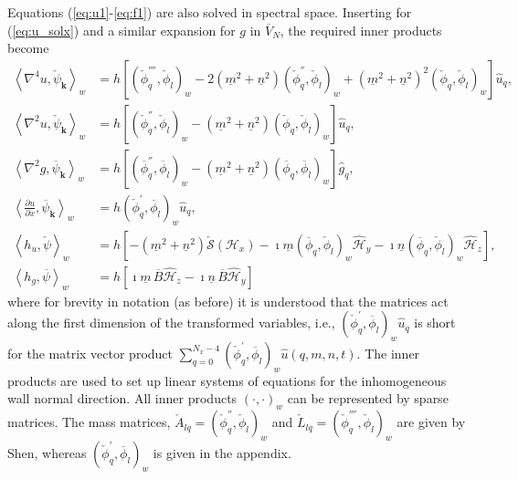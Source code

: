 \documentclass[11pt, oneside]{article}
\newcommand{\N}[1]{\check{#1}}
\newcommand{\D}[1]{\overline{#1}}
\begin{document}
Equations (\ref{eq:u1}-\ref{eq:f1}) are also solved in spectral space. 
Inserting for (\ref{eq:u_solx}) and a similar expansion for $g$ in $\D{V}_N$, 
the required inner products become
\begin{align}
\left<\nabla^4u, \N{\psi}_{\bm{k}}\right>_w &= h\left[ \left( 
\N{\phi}_q^{''''}, 
\N{\phi}_l\right)_w -2(\underline{m}^2+\underline{n}^2) \left( \N{\phi}_q^{''}, 
\N{\phi}_l\right)_w + (\underline{m}^2+\underline{n}^2)^2\left( \N{\phi}_q, 
\N{\phi}_l\right)_w  \right] \hat{u}_q, \\
\left< \nabla^2 u, \N{\psi}_{\bm{k}}\right>_w &= h\left[\left( \N{\phi}_q^{''}, 
\N{\phi}_l\right)_w - (\underline{m}^2+\underline{n}^2)\left( \N{\phi}_q, 
\N{\phi}_l \right)_w \right] \hat{u}_q, \\
\left< \nabla^2 g, \D{\psi}_{\bm{k}}\right>_w &= h\left[\left( \D{\phi}_q^{''}, 
\D{\phi}_l\right)_w - (\underline{m}^2+\underline{n}^2)\left( \D{\phi}_q, 
\D{\phi}_l \right)_w \right] \hat{g}_q, \\
\left<\frac{\partial u}{\partial x}, \D{\psi}_{\bm{k}}\right>_w &=
h\left(\N{\phi}_q^{'}, \D{\phi}_l\right)_w \hat{u}_q, \\
\left<h_u, \N{\psi} \right>_w &= h\left[-(\underline{m}^2+\underline{n}^2) 
\N{\mathcal{S}}(\mathcal{H}_x) - \imath \underline{m}\left(\D{\phi}_q, 
\N{\phi}_l \right)_w \hat{\mathcal{H}}_y - \imath 
\underline{n}\left(\D{\phi}_q, \N{\phi}_l \right)_w \hat{\mathcal{H}}_z\right], 
\\
\left< h_g, \D{\psi} \right>_w &= h\left[ \imath \underline{m}\, \D{B} 
\hat{\mathcal{H}}_z - \imath \underline{n}\, \D{B} \hat{\mathcal{H}}_y 
\right]
\end{align}
where for brevity in notation (as before) it is understood that the matrices 
act along the first dimension of the transformed variables, i.e.,  $ 
\left(\N{\phi}_q^{'}, \D{\phi}_l\right)_w \hat{u}_q$ is short for the matrix 
vector product $ \sum_{q=0}^{N_x-4}\left( \N{\phi}_q^{'}, \D{\phi}_l\right)_w 
\hat{u}(q, {m}, {n}, t)$. The inner products are used to set up linear systems 
of equations for the inhomogeneous wall normal direction. All inner products 
$\left(\cdot, \cdot\right)_w$ can be represented by sparse matrices.
The mass matrices, $\N{A}_{lq} = \left( \N{\phi}_q^{''}, \N{\phi}_l\right)_w 
$ and $\N{L}_{lq} = \left(\N{\phi}^{''''}_q, \N{\phi}_l\right)_w$ are given by 
Shen, whereas $\left(\N{\phi}_q^{'}, \D{\phi}_l\right)_w$ is given in the 
appendix.
\end{document}
